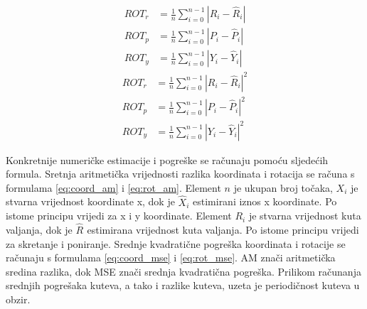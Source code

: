 \begin{equation}
  \begin{aligned}
ROT_{r} &= \frac{1}{n}\sum_{i=0}^{n-1} |R_{i} - \hat{R}_{i}|\\
ROT_{p} &= \frac{1}{n}\sum_{i=0}^{n-1} |P_{i} - \hat{P}_{i}|\\
ROT_{y} &= \frac{1}{n}\sum_{i=0}^{n-1} |Y_{i} - \hat{Y}_{i}|
  \end{aligned}
  \label{eq:rot_am}
\end{equation}
\begin{equation}
  \begin{aligned}
ROT_{r} &= \frac{1}{n}\sum_{i=0}^{n-1} |R_{i} - \hat{R}_{i}|^2\\
ROT_{p} &= \frac{1}{n}\sum_{i=0}^{n-1} |P_{i} - \hat{P}_{i}|^2\\
ROT_{y} &= \frac{1}{n}\sum_{i=0}^{n-1} |Y_{i} - \hat{Y}_{i}|^2
  \end{aligned}
  \label{eq:rot_mse}
\end{equation}


Konkretnije numeričke estimacije i pogreške se računaju pomoću sljedećih formula. Sretnja aritmetička vrijednosti razlika koordinata i rotacija se računa s formulama \ref{eq:coord_am} i \ref{eq:rot_am}. Element $n$ je ukupan broj točaka, $X_{i}$ je stvarna vrijednost koordinate x, dok je $\hat{X}_{i}$ estimirani iznos x koordinate. Po istome principu vrijedi za x i y koordinate. Element $R_{i}$ je stvarna vrijednost kuta valjanja, dok je $\hat{R}_{}$ estimirana vrijednost kuta valjanja. Po istome principu vrijedi za skretanje i poniranje. Srednje kvadratične pogreška koordinata i rotacije se računaju s formulama \ref{eq:coord_mse} i \ref{eq:rot_mse}. AM znači aritmetička sredina razlika, dok MSE znači srednja kvadratična pogreška. Prilikom računanja srednjih pogrešaka kuteva, a tako i razlike kuteva, uzeta je periodičnost kuteva u obzir.
\pagebreak